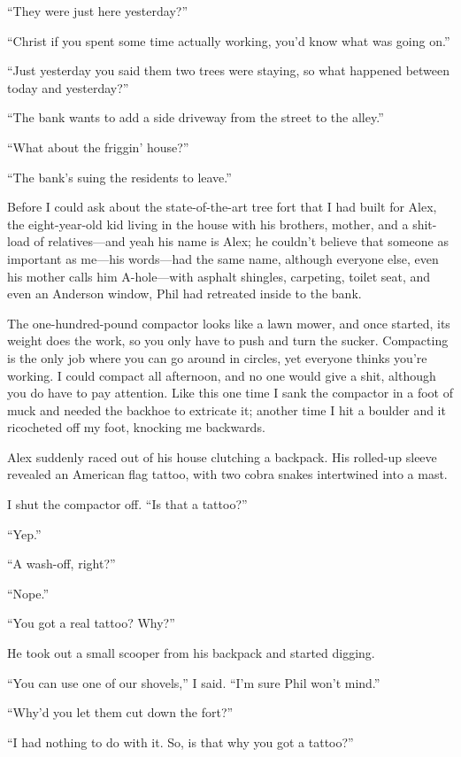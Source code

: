 ``They were just here yesterday?''

``Christ if you spent some time actually working, you'd know what was
going on.''

``Just yesterday you said them two trees were staying, so what happened
between today and yesterday?''

``The bank wants to add a side driveway from the street to the alley.''

``What about the friggin' house?''

``The bank's suing the residents to leave.''

Before I could ask about the state-of-the-art tree fort that I had built
for Alex, the eight-year-old kid living in the house with his brothers,
mother, and a shit-load of relatives---and yeah his name is Alex; he
couldn't believe that someone as important as me---his words---had the
same name, although everyone else, even his mother calls him
A-hole---with asphalt shingles, carpeting, toilet seat, and even an
Anderson window, Phil had retreated inside to the bank.

The one-hundred-pound compactor looks like a lawn mower, and once
started, its weight does the work, so you only have to push and turn the
sucker. Compacting is the only job where you can go around in circles,
yet everyone thinks you're working. I could compact all afternoon, and
no one would give a shit, although you do have to pay attention. Like
this one time I sank the compactor in a foot of muck and needed the
backhoe to extricate it; another time I hit a boulder and it ricocheted
off my foot, knocking me backwards.

Alex suddenly raced out of his house clutching a backpack. His rolled-up
sleeve revealed an American flag tattoo, with two cobra snakes
intertwined into a mast.

I shut the compactor off. ``Is that a tattoo?''

``Yep.''

``A wash-off, right?''

``Nope.''

``You got a real tattoo? Why?''

He took out a small scooper from his backpack and started digging.

``You can use one of our shovels,'' I said. ``I'm sure Phil won't
mind.''

``Why'd you let them cut down the fort?''

``I had nothing to do with it. So, is that why you got a tattoo?''

